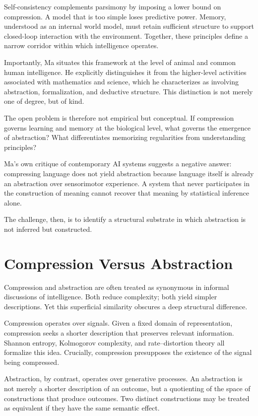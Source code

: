 \documentclass[11pt]{article}
\begin{document}
Self-consistency complements parsimony by imposing a lower bound on
compression. A model that is too simple loses predictive power. Memory,
understood as an internal world model, must retain sufficient structure to
support closed-loop interaction with the environment. Together, these
principles define a narrow corridor within which intelligence operates.

Importantly, Ma situates this framework at the level of animal and common
human intelligence. He explicitly distinguishes it from the higher-level
activities associated with mathematics and science, which he characterizes
as involving abstraction, formalization, and deductive structure. This
distinction is not merely one of degree, but of kind.

The open problem is therefore not empirical but conceptual. If compression
governs learning and memory at the biological level, what governs the
emergence of abstraction? What differentiates memorizing regularities from
understanding principles?

Ma’s own critique of contemporary AI systems suggests a negative answer:
compressing language does not yield abstraction because language itself is
already an abstraction over sensorimotor experience. A system that never
participates in the construction of meaning cannot recover that meaning by
statistical inference alone.

The challenge, then, is to identify a structural substrate in which
abstraction is not inferred but constructed.

\section{Compression Versus Abstraction}

Compression and abstraction are often treated as synonymous in informal
discussions of intelligence. Both reduce complexity; both yield simpler
descriptions. Yet this superficial similarity obscures a deep structural
difference.

Compression operates over signals. Given a fixed domain of representation,
compression seeks a shorter description that preserves relevant
information. Shannon entropy, Kolmogorov complexity, and rate–distortion
theory all formalize this idea. Crucially, compression presupposes the
existence of the signal being compressed.

Abstraction, by contrast, operates over generative processes. An
abstraction is not merely a shorter description of an outcome, but a
quotienting of the space of constructions that produce outcomes. Two
distinct constructions may be treated as equivalent if they have the same
semantic effect.
\end{document}
